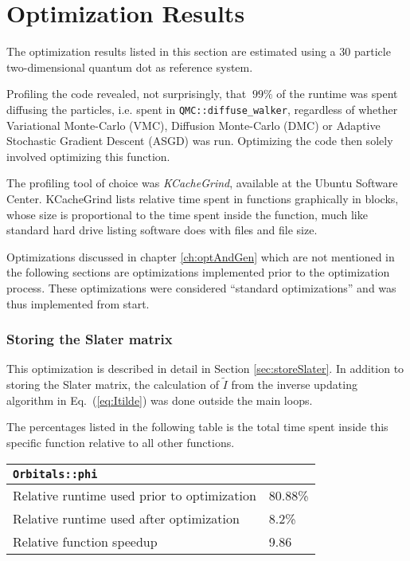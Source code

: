 \section{Optimization Results}
\label{sec:optRes}

The optimization results listed in this section are estimated using a $30$ particle two-dimensional quantum dot as reference system.

Profiling the code revealed, not surprisingly, that $~99\%$ of the runtime was spent diffusing the particles, i.e. spent in \verb+QMC::diffuse_walker+, regardless of whether Variational Monte-Carlo (VMC), Diffusion Monte-Carlo (DMC) or Adaptive Stochastic Gradient Descent (ASGD) was run. Optimizing the code then solely involved optimizing this function. 

The profiling tool of choice was \textit{KCacheGrind}, available at the Ubuntu Software Center. KCacheGrind lists relative time spent in functions graphically in blocks, whose size is proportional to the time spent inside the function, much like standard hard drive listing software does with files and file size.

Optimizations discussed in chapter \ref{ch:optAndGen} which are not mentioned in the following sections are optimizations implemented prior to the optimization process. These optimizations were considered ``standard optimizations'' and was thus implemented from start. 

\subsubsection{Storing the Slater matrix}

This optimization is described in detail in Section \ref{sec:storeSlater}. In addition to storing the Slater matrix, the calculation of $\tilde I$ from the inverse updating algorithm in Eq.~(\ref{eq:Itilde}) was done outside the main loops.

The percentages listed in the following table is the total time spent inside this specific function relative to all other functions. 

\begin{tabular}{ll}
 \verb+Orbitals::phi+ & \\
 \hline\hline
 Relative runtime used prior to optimization & 80.88\% \\
 Relative runtime used after optimization    & 8.2\% \\
 \hline
 Relative function speedup                   & 9.86
\end{tabular}

